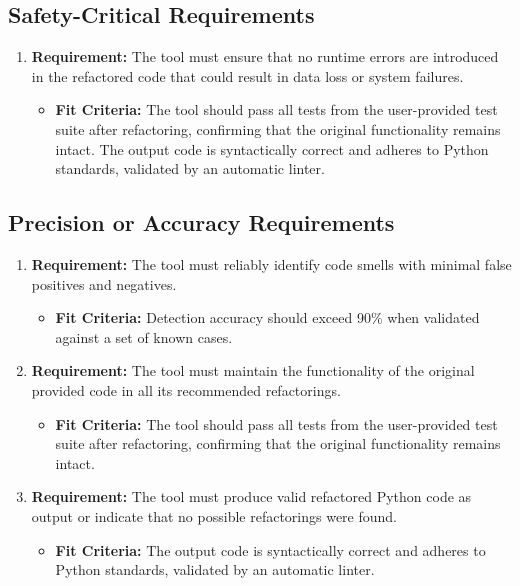 \documentclass[12pt]{article}
\begin{document}
\subsection{Safety-Critical Requirements}
\begin{enumerate}
  \item \textbf{Requirement:} The tool must ensure that no runtime errors are introduced in the refactored code that could result in data loss or system failures.
  \begin{itemize}[label={}]
      \item \textbf{Fit Criteria:} The tool should pass all tests from the user-provided test suite after refactoring, confirming that the original functionality remains intact. The output code is syntactically correct and adheres to Python standards, validated by an automatic linter.
  \end{itemize}
\end{enumerate}

\subsection{Precision or Accuracy Requirements}
\begin{enumerate}
  \item \textbf{Requirement:} The tool must reliably identify code smells with minimal false positives and negatives.
  \begin{itemize}[label={}]
      \item \textbf{Fit Criteria:} Detection accuracy should exceed 90\% when validated against a set of known cases.
  \end{itemize}
  \item \textbf{Requirement:} The tool must maintain the functionality of the original provided code in all its recommended refactorings.
  \begin{itemize}[label={}]
      \item \textbf{Fit Criteria:} The tool should pass all tests from the user-provided test suite after refactoring, confirming that the original functionality remains intact.
  \end{itemize}
  \item \textbf{Requirement:} The tool must produce valid refactored Python code as output or indicate that no possible refactorings were found.
  \begin{itemize}[label={}]
      \item \textbf{Fit Criteria:} The output code is syntactically correct and adheres to Python standards, validated by an automatic linter.
  \end{itemize}
\end{enumerate}
\end{document}
